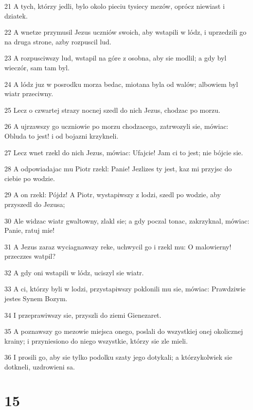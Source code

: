 \par 21 A tych, którzy jedli, bylo okolo pieciu tysiecy mezów, oprócz niewiast i dziatek.
\par 22 A wnetze przymusil Jezus uczniów swoich, aby wstapili w lódz, i uprzedzili go na druga strone, azby rozpuscil lud.
\par 23 A rozpusciwszy lud, wstapil na góre z osobna, aby sie modlil; a gdy byl wieczór, sam tam byl.
\par 24 A lódz juz w posrodku morza bedac, miotana byla od walów; albowiem byl wiatr przeciwny.
\par 25 Lecz o czwartej strazy nocnej szedl do nich Jezus, chodzac po morzu.
\par 26 A ujrzawszy go uczniowie po morzu chodzacego, zatrwozyli sie, mówiac: Obluda to jest! i od bojazni krzykneli.
\par 27 Lecz wnet rzekl do nich Jezus, mówiac: Ufajcie! Jam ci to jest; nie bójcie sie.
\par 28 A odpowiadajac mu Piotr rzekl: Panie! Jezlizes ty jest, kaz mi przyjsc do ciebie po wodzie.
\par 29 A on rzekl: Pójdz! A Piotr, wystapiwszy z lodzi, szedl po wodzie, aby przyszedl do Jezusa;
\par 30 Ale widzac wiatr gwaltowny, zlakl sie; a gdy poczal tonac, zakrzyknal, mówiac: Panie, ratuj mie!
\par 31 A Jezus zaraz wyciagnawszy reke, uchwycil go i rzekl mu: O malowierny! przeczzes watpil?
\par 32 A gdy oni wstapili w lódz, uciszyl sie wiatr.
\par 33 A ci, którzy byli w lodzi, przystapiwszy poklonili mu sie, mówiac: Prawdziwie jestes Synem Bozym.
\par 34 I przeprawiwszy sie, przyszli do ziemi Gienezaret.
\par 35 A poznawszy go mezowie miejsca onego, poslali do wszystkiej onej okolicznej krainy; i przyniesiono do niego wszystkie, którzy sie zle mieli.
\par 36 I prosili go, aby sie tylko podolku szaty jego dotykali; a którzykolwiek sie dotkneli, uzdrowieni sa.

\chapter{15}


